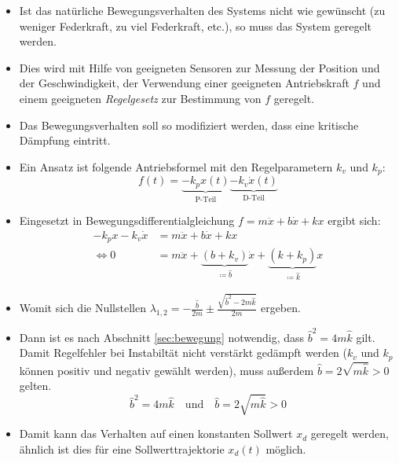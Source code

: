 \documentclass[a4paper, 11pt, accentcolor = tud3b]{tudreport}
\begin{document}
					\begin{itemize}
						\item Ist das natürliche Bewegungsverhalten des Systems nicht wie gewünscht (zu weniger Federkraft, zu viel Federkraft, etc.), so muss das System geregelt werden.
						\item Dies wird mit Hilfe von geeigneten Sensoren zur Messung der Position und der Geschwindigkeit, der Verwendung einer geeigneten Antriebskraft \(f\) und einem geeigneten \textit{Regelgesetz} zur Bestimmung von \(f\) geregelt.
						\item Das Bewegungsverhalten soll so modifiziert werden, dass eine kritische Dämpfung eintritt.
						\item Ein Ansatz ist folgende Antriebsformel mit den Regelparametern \( k _ v \) und \( k _ p \):
							\begin{equation*}
								f(t) = \underbrace{-k_px(t)}_{\text{P-Teil}} \underbrace{-k_v\dot{x}(t)}_{\text{D-Teil}}
							\end{equation*}
						\item Eingesetzt in Bewegungsdifferentialgleichung \( f = m\ddot{x} + b\dot{x} + kx \) ergibt sich:
							\begin{align*}
								     -k_px -k_v\dot{x} &= m\ddot{x} + b\dot{x} + kx \\
								\iff 0 &= m\ddot{x} + \underbrace{(b + k_v)}_{ \coloneqq \hat{b} }\dot{x} + \underbrace{(k + k_p)}_{ \coloneqq \hat{k} }x
							\end{align*}
						\item Womit sich die Nullstellen \( \lambda _ { 1, 2 } = -\frac{\hat{b}}{2m} \pm \frac{\sqrt{\hat{b}^2 - 2m\hat{k}}}{2m} \) ergeben.
						\item Dann ist es nach Abschnitt \ref{sec:bewegung} notwendig, dass \( \hat{b}^2 = 4m\hat{k} \) gilt. Damit Regelfehler bei Instabiltät nicht verstärkt gedämpft werden (\( k_v \) und \( k_p \) können positiv und negativ gewählt werden), muss außerdem \( \hat{b} = 2\sqrt{m\hat{k}} > 0 \) gelten.
							\begin{equation*}
								\hat{b}^2 = 4m\hat{k} \quad\text{und}\quad \hat{b} = 2\sqrt{m\hat{k}} > 0
							\end{equation*}
						\item Damit kann das Verhalten auf einen konstanten Sollwert \( x _ d \) geregelt werden, ähnlich ist dies für eine Sollwerttrajektorie \( x _ d (t) \) möglich.
					\end{itemize}
				
\end{document}
